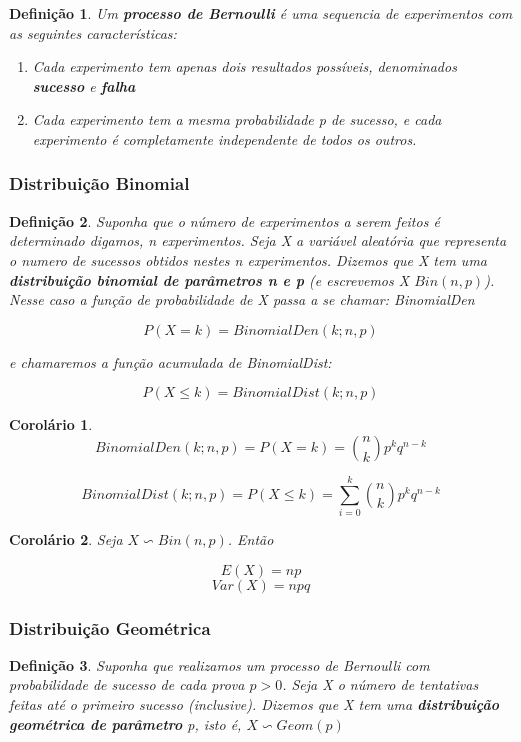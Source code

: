 \documentclass[12pt]{article}
\newtheorem{corollary}{Corolário}[theorem]
\newtheorem{definition}{Definição}
\begin{document}
\begin{definition}
    Um \textbf{processo de Bernoulli} é uma sequencia de experimentos com as seguintes características:
    
    \begin{enumerate}
        \item Cada experimento tem apenas dois resultados possíveis, denominados \textbf{sucesso} e \textbf{falha}
        
        \item Cada experimento tem a mesma probabilidade p de sucesso, e cada experimento é completamente independente de todos os outros.
    \end{enumerate}
\end{definition}

\subsubsection*{Distribuição Binomial}

\begin{definition}
    Suponha que o número de experimentos a serem feitos é determinado digamos, n experimentos. Seja X a variável aleatória que representa o numero de sucessos obtidos nestes n experimentos. Dizemos que X tem uma \textbf{distribuição binomial de parâmetros n e p} (e escrevemos X \backsim $Bin(n, p)$). Nesse caso a função de probabilidade de X passa a se chamar: BinomialDen
    
    $$P(X = k) = BinomialDen (k; n, p)$$
    
    e chamaremos a função acumulada de BinomialDist:
    
    $$P(X \leq k) = BinomialDist (k; n, p)$$
\end{definition}

\begin{corollary}
    $$BinomialDen (k;n, p) = P(X = k) = {n \choose k} p^k q^{n-k}$$
    
    $$BinomialDist (k; n, p) = P(X \leq k) = \sum_{i = 0}^k {n \choose k} p^k q^{n - k}$$
\end{corollary}

\begin{corollary}
    Seja $X \backsim Bin (n, p)$. Então
    
    $$E(X) = n p$$
    $$Var (X) = n p q$$
\end{corollary}

\subsubsection*{Distribuição Geométrica}
\begin{definition}
    Suponha que realizamos um processo de Bernoulli com probabilidade de sucesso de cada prova $p > 0$. Seja X o número de tentativas feitas até o primeiro sucesso (inclusive). Dizemos que X tem uma \textbf{distribuição geométrica de parâmetro} p, isto é, $X \backsim Geom (p)$
\end{definition}
\end{document}
